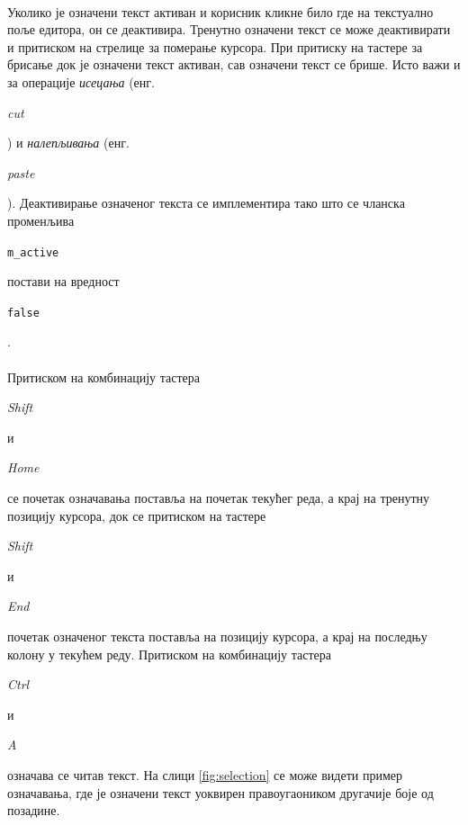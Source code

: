 \documentclass[12pt,oneside]{memoir}
\begin{document}
\paragraph{}
Уколико је означени текст активан и корисник кликне било где на текстуално поље едитора,
он се деактивира. Тренутно означени текст се може деактивирати и притиском на стрелице за померање курсора. При притиску на тастере за брисање док је означени текст активан, сав означени текст се брише. Исто важи и за операције \emph{исецања}
(енг. \begin{latinica}\textit{cut}\end{latinica}) и \emph{налепљивања}
(енг. \begin{latinica}\textit{paste}\end{latinica}). Деактивирање означеног текста
се имплементира тако што се чланска променљива 
\begin{latinica}\verb|m_active|\end{latinica} постави на вредност
\begin{latinica}\verb|false|\end{latinica}.

\paragraph{}
Притиском на комбинацију тастера \begin{latinica}\textit{Shift}\end{latinica} и
\begin{latinica}\textit{Home}\end{latinica} се почетак означавања поставља на почетак 
текућег реда, а крај на тренутну позицију курсора, док се притиском на тастере 
\begin{latinica}\textit{Shift}\end{latinica} и \begin{latinica}\textit{End}\end{latinica}
почетак означеног текста поставља на позицију курсора, а крај на последњу колону у текућем
реду. Притиском на комбинацију тастера \begin{latinica}\textit{Ctrl}\end{latinica} и
\begin{latinica}\textit{A}\end{latinica} означава се читав текст. На слици 
\ref{fig:selection} се може видети пример означавања, где је означени текст
уоквирен правоугаоником другачије боје од позадине.
\end{document}
